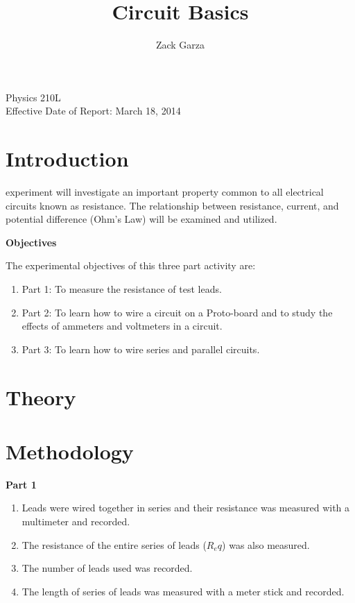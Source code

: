 \documentclass[twocolumn,english]{IEEEtran}
\theoremstyle{plain}
\theoremstyle{plain}
\begin{document}
\title{Circuit Basics}


\author{Zack Garza}


\IEEEspecialpapernotice
{Physics 210L \\
Effective Date of Report: March 18, 2014}


\maketitle
\tableofcontents

\section{Introduction}
 experiment will investigate an important property common to all electrical circuits known as resistance. The relationship between resistance, current, and potential difference (Ohm's Law) will be examined and utilized.

\begin{centering}
 \textbf{Objectives}
\end{centering}
The experimental objectives of this three part activity are:
\begin{enumerate}
 \item Part 1: To measure the resistance of test leads.
 \item Part 2: To learn how to wire a circuit on a Proto-board and to study the effects of ammeters and voltmeters in a circuit.
 \item Part 3: To learn how to wire series and parallel circuits.
\end{enumerate}


\section{Theory}

\section{Methodology}
\textbf{Part 1}
\begin{enumerate}
 \item Leads were wired together in series and their resistance was measured with a multimeter and recorded.
 \item The resistance of the entire series of leads ($R_eq$) was also measured.
 \item The number of leads used was recorded.
 \item The length of series of leads was measured with a meter stick and recorded.
\end{enumerate}
\end{document}
